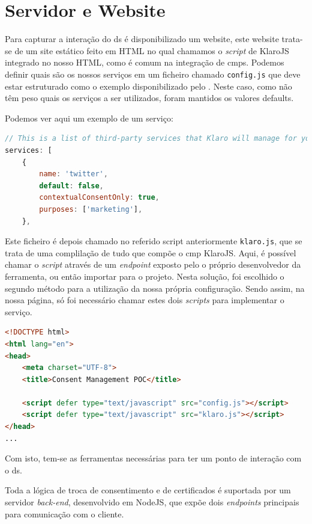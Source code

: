 \section{Servidor e Website}

Para capturar a interação do \acrshort{ds} é disponibilizado um website, este website trata-se de um site estático feito em HTML no qual chamamos o \textit{script} de KlaroJS integrado no nosso HTML, como é comum na integração de \acrshort{cmp}s. Podemos definir quais são os nossos serviços em um ficheiro chamado \texttt{config.js} que deve estar estruturado como o exemplo disponibilizado pelo \cite{gitklaro}. Neste caso, como não têm peso quais os serviços a ser utilizados, foram mantidos os valores defaults. 

Podemos ver aqui um exemplo de um serviço:

\begin{lstlisting}[language=Javascript]
// This is a list of third-party services that Klaro will manage for you.
services: [
	{
		name: 'twitter',
		default: false,
		contextualConsentOnly: true,
		purposes: ['marketing'],
	},
\end{lstlisting}

Este ficheiro é depois chamado no referido script anteriormente \texttt{klaro.js}, que se trata de uma complilação de tudo que compõe o \acrshort{cmp} KlaroJS. Aqui, é possível chamar o \textit{script} através de um \textit{endpoint} exposto pelo o próprio desenvolvedor da ferramenta, ou então importar para o projeto. Nesta solução, foi escolhido o segundo método para a utilização da nossa própria configuração. Sendo assim, na nossa página, só foi necessário chamar estes dois \textit{scripts} para implementar o serviço. 

\begin{lstlisting}[language=HTML]
<!DOCTYPE html>
<html lang="en">
<head>
    <meta charset="UTF-8">
    <title>Consent Management POC</title>

    <script defer type="text/javascript" src="config.js"></script>
    <script defer type="text/javascript" src="klaro.js"></script>
</head>
...
\end{lstlisting}


Com isto, tem-se as ferramentas necessárias para ter um ponto de interação com o \acrshort{ds}.

Toda a lógica de troca de consentimento e de certificados é suportada por um servidor \textit{back-end}, desenvolvido em NodeJS, que expõe dois \textit{endpoints} principais para comunicação com o cliente.

